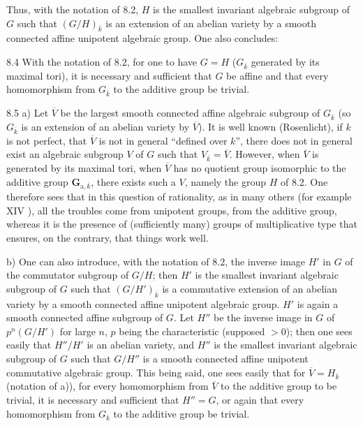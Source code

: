 Thus, with the notation of 8.2, $H$ is the smallest invariant algebraic subgroup of $G$ such that $(G/H)_{\overline k}$ is an extension of an abelian variety by a smooth connected affine unipotent algebraic group. One also concludes:
\begin{corollary}{8.4}\label{XII.8.4}
With the notation of 8.2, for one to have $G=H$ (\ie $G_{\overline k}$ generated by its maximal tori), it is necessary and sufficient that $G$ be affine and that every homomorphism from $G_{\overline k}$ to the additive group be trivial.
\end{corollary}
\begin{remarks}{8.5}\label{XII.8.5}
a) Let $\overline V$ be the largest smooth connected affine algebraic subgroup of $G_{\overline k}$ (so $G_{\overline k}$ is an extension of an abelian variety by $\overline V$). It is well known (Rosenlicht), if $k$ is not perfect, that $\overline V$ is not in general ``defined over $k$'', \ie there does not in general exist an algebraic subgroup $V$ of $G$ such that $V_{\overline k}=\overline V$. However, when $\overline V$ is generated by its maximal tori, \ie when $\overline V$ has no quotient group isomorphic to the additive group $\mathbf G_{\mathrm a,\overline k}$, there exists such a $V$, namely the group $H$ of 8.2. One therefore sees that in this question of rationality, as in many others (\cf for example XIV ), all the troubles come from unipotent groups, \ie from the additive group, whereas it is the presence of (sufficiently many) groups of multiplicative type that ensures, on the contrary, that things work well.

b) One can also introduce, with the notation of 8.2, the inverse image $H'$ in $G$ of the commutator subgroup of $G/H$; then $H'$ is the smallest invariant algebraic subgroup of $G$ such that $(G/H')_{\overline k}$ is a commutative extension of an abelian variety by a smooth connected affine unipotent algebraic group. $H'$ is again a smooth connected affine subgroup of $G$. Let $H''$ be the inverse image in $G$ of $p^n(G/H')$ for large $n$, $p$ being the characteristic (supposed $>0$); then one sees easily that $H''/H'$ is an abelian variety, and $H''$ is the smallest invariant algebraic subgroup of $G$ such that $G/H''$ is a smooth connected affine unipotent commutative algebraic group. This being said, one sees easily that for $\overline V=H_{\overline k}$ (notation of a)), \ie for every homomorphism from $\overline V$ to the additive group to be trivial, it is necessary and sufficient that $H''=G$, or again that every homomorphism from $G_{\overline k}$ to the additive group be trivial.
\end{remarks}


